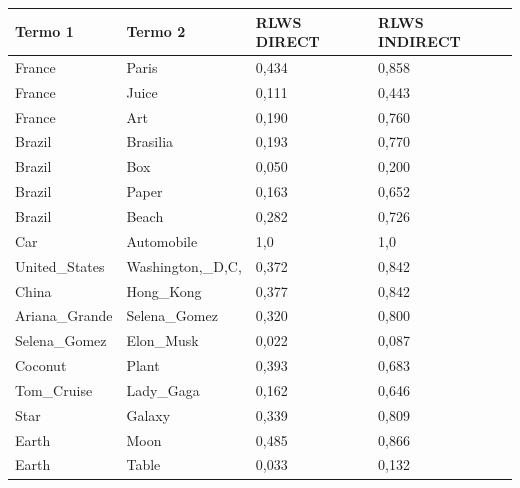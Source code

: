 \begin{table}[H]
\centering
\begin{tabular}{|l|l|l|l|}
\hline
\textbf{Termo 1} & \textbf{Termo 2}    & \textbf{RLWS DIRECT} & \textbf{RLWS INDIRECT} \\ \hline
France           & Paris               & 0,434                   & 0,858                   \\ \hline
France           & Juice               & 0,111                   & 0,443                   \\ \hline
France           & Art                 & 0,190                   & 0,760                   \\ \hline
Brazil           & Brasilia            & 0,193                   & 0,770                   \\ \hline
Brazil           & Box                 & 0,050                   & 0,200                   \\ \hline
Brazil           & Paper               & 0,163                   & 0,652                   \\ \hline
Brazil           & Beach               & 0,282                   & 0,726                   \\ \hline
Car              & Automobile          & 1,0                     & 1,0                     \\ \hline
United\_States   & Washington,\_D,C,   & 0,372                   & 0,842                   \\ \hline
China            & Hong\_Kong          & 0,377                   & 0,842                   \\ \hline
Ariana\_Grande   & Selena\_Gomez       & 0,320                   & 0,800                   \\ \hline
Selena\_Gomez    & Elon\_Musk          & 0,022                   & 0,087                   \\ \hline
Coconut          & Plant               & 0,393                   & 0,683                   \\ \hline
Tom\_Cruise      & Lady\_Gaga          & 0,162                   & 0,646                   \\ \hline
Star             & Galaxy              & 0,339                   & 0,809                   \\ \hline
Earth            & Moon                & 0,485                   & 0,866                   \\ \hline
Earth            & Table               & 0,033                   & 0,132                   \\ \hline

\end{tabular}
\end{table}
